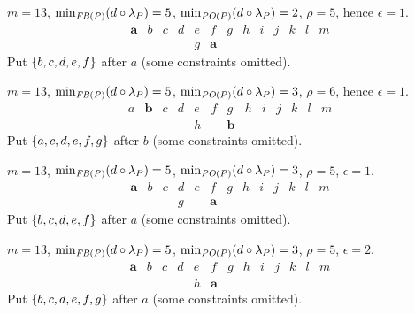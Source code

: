 \documentclass[pagesize, twoside=off, bibliography=totoc, DIV=calc, fontsize=12pt, a4paper]{scrartcl}
\begin{document}
\begin{example}
	$m = 13$, $\minineq[\FBP] = 5$, $\minineq[\POP] = 2$, $\rho = 5$, hence $\epsilon = 1$.
	\begin{equation}
		\begin{array}{lllllllllllll}
			\bm{a}	& b	& c	& d	& e	& f	& g	& h	& i & j & k & l & m\\
			& & & & g & \bm{a}
		\end{array}
	\end{equation}
	Put $\{b, c, d, e, f\}$ after $a$ (some constraints omitted).
\end{example}

\begin{example}
	$m = 13$, $\minineq[\FBP] = 5$, $\minineq[\POP] = 3$, $\rho = 6$, hence $\epsilon = 1$.
	\begin{equation}
		\begin{array}{lllllllllllll}
			a	& \bm{b}	& c	& d	& e	& f	& g	& h	& i & j & k & l & m\\
			& & & & h & & \bm{b}
		\end{array}
	\end{equation}
	Put $\{a, c, d, e, f, g\}$ after $b$ (some constraints omitted).
\end{example}

\begin{example}
	$m = 13$, $\minineq[\FBP] = 5$, $\minineq[\POP] = 3$, $\rho = 5$, $\epsilon = 1$.
	\begin{equation}
		\begin{array}{lllllllllllll}
			\bm{a}	& b	& c	& d	& e	& f	& g	& h	& i & j & k & l & m\\
			& & & g & & \bm{a}
		\end{array}
	\end{equation}
	Put $\{b, c, d, e, f\}$ after $a$ (some constraints omitted).
\end{example}

\begin{example}
	$m = 13$, $\minineq[\FBP] = 5$, $\minineq[\POP] = 3$, $\rho = 5$, $\epsilon = 2$.
	\begin{equation}
		\begin{array}{lllllllllllll}
			\bm{a}	& b	& c	& d	& e	& f	& g	& h	& i & j & k & l & m\\
			& & & & h & \bm{a}
		\end{array}
	\end{equation}
	Put $\{b, c, d, e, f, g\}$ after $a$ (some constraints omitted).
\end{example}
\end{document}
